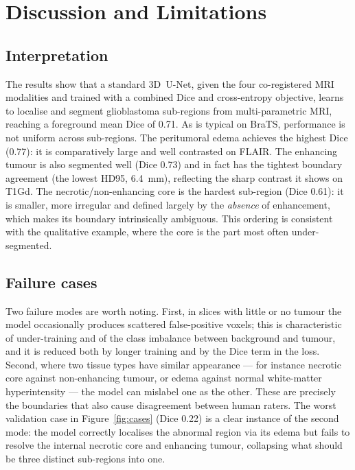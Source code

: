 \chapter{Discussion and Limitations}
\label{ch:discussion}

\section{Interpretation}

The results show that a standard 3D~U-Net, given the four co-registered MRI
modalities and trained with a combined Dice and cross-entropy objective, learns to
localise and segment glioblastoma sub-regions from multi-parametric MRI, reaching a
foreground mean Dice of 0.71. As is typical on BraTS, performance is not uniform
across sub-regions. The peritumoral edema achieves the highest Dice (0.77): it is
comparatively large and well contrasted on FLAIR. The enhancing tumour is also
segmented well (Dice 0.73) and in fact has the tightest boundary agreement (the
lowest HD95, 6.4~mm), reflecting the sharp contrast it shows on T1Gd. The
necrotic/non-enhancing core is the hardest sub-region (Dice 0.61): it is smaller,
more irregular and defined largely by the \emph{absence} of enhancement, which
makes its boundary intrinsically ambiguous. This ordering is consistent with the
qualitative example, where the core is the part most often under-segmented.

\section{Failure cases}
\label{sec:failure-cases}

Two failure modes are worth noting. First, in slices with little or no tumour the
model occasionally produces scattered false-positive voxels; this is characteristic
of under-training and of the class imbalance between background and tumour, and it
is reduced both by longer training and by the Dice term in the loss. Second, where
two tissue types have similar appearance --- for instance necrotic core against
non-enhancing tumour, or edema against normal white-matter hyperintensity --- the
model can mislabel one as the other. These are precisely the boundaries that also
cause disagreement between human raters. The worst validation case in
Figure~\ref{fig:cases} (Dice 0.22) is a clear instance of the second mode: the
model correctly localises the abnormal region via its edema but fails to resolve
the internal necrotic core and enhancing tumour, collapsing what should be three
distinct sub-regions into one.

